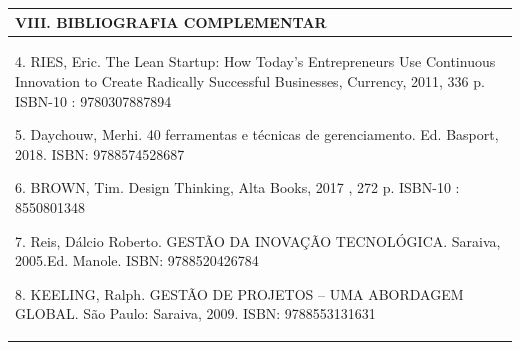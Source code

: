 \documentclass[12pt]{article}
\begin{document}

\begin{longtable}{|L{1.025\textwidth}|} \hline
%
{\bf VIII. BIBLIOGRAFIA COMPLEMENTAR} \\ \hline

 4. RIES, Eric. The Lean Startup: How Today's Entrepreneurs Use Continuous Innovation to Create Radically Successful Businesses, Currency, 2011,  336 p. ISBN-10 : 9780307887894
 
 5. Daychouw, Merhi. 40 ferramentas e técnicas de gerenciamento. Ed. Basport, 2018. ISBN: 9788574528687
 
 6. BROWN, Tim.  Design Thinking, Alta Books, 2017 , 272 p. ISBN-10 : 8550801348
 
 7. Reis, Dálcio Roberto. GESTÃO DA INOVAÇÃO TECNOLÓGICA. Saraiva, 2005.Ed. Manole. ISBN: 9788520426784

 8. KEELING, Ralph. GESTÃO DE PROJETOS – UMA ABORDAGEM GLOBAL. São Paulo: Saraiva, 2009. ISBN: 9788553131631






 \\ \hline
\end{longtable}



\end{document}
